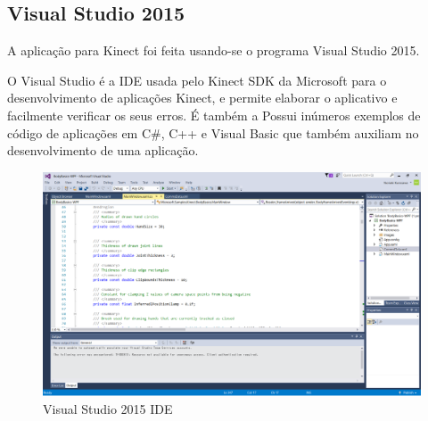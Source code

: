 		\subsection{Visual Studio 2015}\label{subsec-VSIDE}
		A aplicação para Kinect foi feita usando-se o programa Visual Studio 2015.\par
		O Visual Studio é a IDE usada pelo Kinect SDK da Microsoft para o desenvolvimento de aplicações Kinect, e permite elaborar o aplicativo e facilmente verificar os seus erros. É também a 
		Possui inúmeros exemplos de código de aplicações em C\#, C++ e Visual Basic que também auxiliam no desenvolvimento de uma aplicação.
		\begin{figure}[h!]
		\caption{\label{fig_VSIDE} Visual Studio 2015 IDE }
		\begin{center}
			\includegraphics[width=\textwidth]{VSIDE.png}	
		\end{center}
		\end{figure}
	
	
